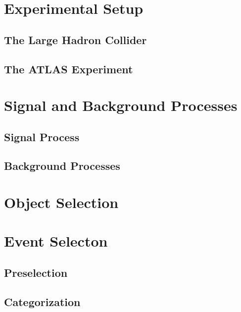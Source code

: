\documentclass[12pt,a4paper,openright]{scrreprt}
\begin{document}
\chapter{Experimental Setup}
\label{cha:experimental_setup}

\section{The Large Hadron Collider}
\label{sec:the_large_hadron_collider}

\section{The ATLAS Experiment}
\label{sec:the_atlas_experiment}

\chapter{Signal and Background Processes}
\label{cha:signal_and_background_processes}

\section{Signal Process}
\label{sec:signal_process}

\section{Background Processes}
\label{sec:background_processes}

\chapter{Object Selection}
\label{cha:object_selection}

\chapter{Event Selecton}
\label{cha:event_selecton}

\section{Preselection}
\label{sec:preselection}

\section{Categorization}
\label{sec:categorization}
\end{document}
